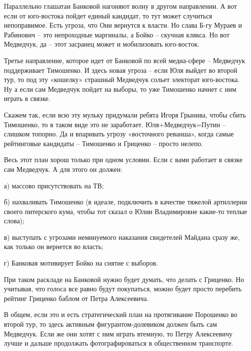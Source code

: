 Параллельно глашатаи Банковой нагоняют волну в другом направлении. А вот если
от юго-востока пойдет единый кандидат, то тут может случиться непоправимое.
Есть угроза, что Они вернутся к власти. Но слава Б-гу Мураев и Рабинович – это
непроходные маргиналы, а Бойко – скучная клякса. Но вот Медведчук, да – этот
засранец может и мобилизовать юго-восток.

Третье направление, которое идет от Банковой по всей медиа-сфере – Медведчук
поддерживает Тимошенко. И здесь новая угроза – если Юля выйдет во второй тур,
то под эту «кошелку» страшный Медведчук сольет электорат юго-востока. Ну а если
сам Медведчук пойдет на выборы, то уже Тимошенко начнет с ним играть в связке.

Скажем так, если всю эту мульку придумали ребята Игоря Грынива, чтобы сбить
Тимошенко, то в таком виде это не заработает. Юля+Медведчук=Путин – слишком
топорно. Да и впаривать угрозу «восточного реванша», когда самые рейтинговые
кандидаты – Тимошенко и Гриценко – просто нелепо.

Весь этот план хорош только при одном условии. Если с вами работает в связке
сам Медведчук. А для этого он должен:

а) массово присутствовать на ТВ;

б) нахваливать Тимошенко (в идеале, подключить в качестве тяжелой артиллерии
своего питерского кума, чтобы тот сказал о Юлии Владимировне какие-то теплые
слова);

в) выступать с угрозами неминуемого наказания свидетелей Майдана сразу же, как
только он вернется во власть;

г) Банковая мотивирует Бойко на снятие с выборов.

При таком раскладе на Банковой нужно будет думать, что делать с Гриценко. Но
учитывая, что голоса все равно будут покупаться, можно будет просто перебить
рейтинг Гриценко баблом от Петра Алексеевича.

В общем, если это и есть стратегический план на протягивание Порошенко во
второй тур, то здесь активным фигурантом-долевиком должен быть сам Медведчук.
Если же они хотят с ним играть втемную, то Петру Алексеевичу лучше и дальше
продолжать фотографироваться в общественном транспорте.

